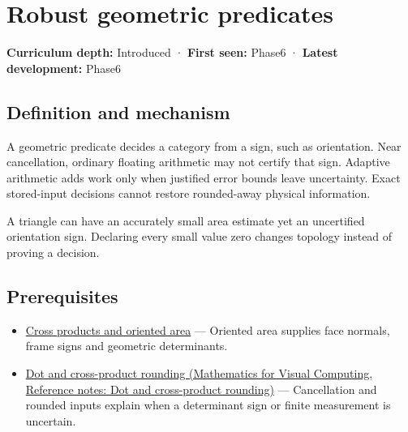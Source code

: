 \hypertarget{appendix-341296fb3f64}{}\label{referencestart:appendix-341296fb3f64}
\section{Robust geometric predicates}\label{appendix-341296fb3f64-robust-geometric-predicates}

\hypertarget{appendix-341296fb3f64-robust-geometric-predicates}{}

\textbf{Curriculum depth:} Introduced · \textbf{First seen:} Phase6 · \textbf{Latest development:} Phase6

\begin{allmightroledefinition}

\subsection{Definition and mechanism}\label{appendix-341296fb3f64-definition-and-mechanism}

\hypertarget{appendix-341296fb3f64-definition-and-mechanism}{}

A geometric predicate decides a category from a sign, such as orientation. Near cancellation, ordinary floating arithmetic may not certify that sign. Adaptive arithmetic adds work only when justified error bounds leave uncertainty. Exact stored-input decisions cannot restore rounded-away physical information.

\end{allmightroledefinition}

A triangle can have an accurately small area estimate yet an uncertified orientation sign. Declaring every small value zero changes topology instead of proving a decision.

\subsection{Prerequisites}\label{appendix-341296fb3f64-prerequisites}

\hypertarget{appendix-341296fb3f64-prerequisites}{}

\begin{itemize}
\tightlist
\item
  \hyperref[appendix-2391db8052b1]{Cross products and oriented area} --- Oriented area supplies face normals, frame signs and geometric determinants.
\item
  \href{../02-Mathematics-for-Visual-Computing/main.pdf\#nameddest=appendix-5aef4f13483a}{Dot and cross-product rounding (Mathematics for Visual Computing, Reference notes: Dot and cross-product rounding)} --- Cancellation and rounded inputs explain when a determinant sign or finite measurement is uncertain.
\end{itemize}

